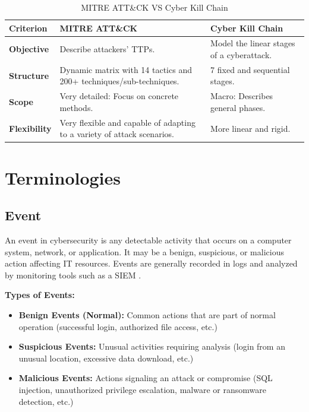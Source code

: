 \begin{table}[H]
\centering
\caption{MITRE ATT\&CK VS Cyber Kill Chain}
\label{tab:mitre-vs-killchain}
\renewcommand{\arraystretch}{1.4}
\begin{tabular}{>{\raggedright\arraybackslash}p{3cm} p{5cm} p{5cm}}
\toprule
\rowcolor{tableheader}
\textbf{Criterion} & \textbf{MITRE ATT\&CK} & \textbf{Cyber Kill Chain} \\
\midrule
\textbf{Objective} & Describe attackers' TTPs. & Model the linear stages of a cyberattack. \\
\midrule
\textbf{Structure} & Dynamic matrix with 14 tactics and 200+ techniques/sub-techniques. & 7 fixed and sequential stages. \\
\midrule
\textbf{Scope} & Very detailed: Focus on concrete methods. & Macro: Describes general phases. \\
\midrule
\textbf{Flexibility} & Very flexible and capable of adapting to a variety of attack scenarios. & More linear and rigid. \\
\bottomrule
\end{tabular}
\end{table}

\section{Terminologies}
\label{sec:terminologies}

\subsection{Event}
\label{subsec:event}

An event in cybersecurity is any detectable activity that occurs on a computer system, network, or application. It may be a benign, suspicious, or malicious action affecting IT resources. Events are generally recorded in logs and analyzed by monitoring tools such as a SIEM \cite{ref24}.

\textbf{Types of Events:}

\begin{itemize}
    \item \textbf{Benign Events (Normal):} Common actions that are part of normal operation (successful login, authorized file access, etc.)
    \item \textbf{Suspicious Events:} Unusual activities requiring analysis (login from an unusual location, excessive data download, etc.)
    \item \textbf{Malicious Events:} Actions signaling an attack or compromise (SQL injection, unauthorized privilege escalation, malware or ransomware detection, etc.)
\end{itemize}

